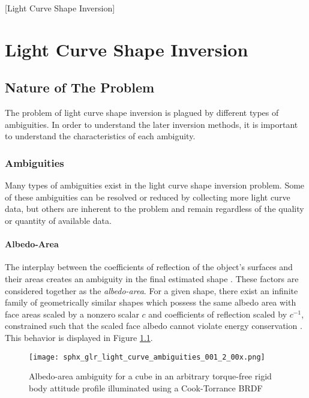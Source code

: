 [Light Curve Shape Inversion]
\graphicspath{{/Users/liamrobinson/Documents/PyLightCurves/docs/build/html/_images}}
\chapter{Light Curve Shape Inversion}

\section{Nature of The Problem}

The problem of light curve shape inversion is plagued by different types of ambiguities. In order to understand the later inversion methods, it is important to understand the characteristics of each ambiguity.

\subsection{Ambiguities}

Many types of ambiguities exist in the light curve shape inversion problem. Some of these ambiguities can be resolved or reduced by collecting more light curve data, but others are inherent to the problem and remain regardless of the quality or quantity of available data.

\subsubsection{Albedo-Area}

The interplay between the coefficients of reflection of the object's surfaces and their areas creates an ambiguity in the final estimated shape \cite{fan2020thesis}. These factors are considered together as the \textit{albedo-area}. For a given shape, there exist an infinite family of geometrically similar shapes which possess the same albedo area with face areas scaled by a nonzero scalar $c$ and coefficients of reflection scaled by $c^{-1}$, constrained such that the scaled face albedo cannot violate energy conservation \cite{fan2020thesis}. This behavior is displayed in Figure \ref{fig:albedo_amb}.

\begin{figure}[!htb]
  \centering
  \texttt{[image: sphx\_glr\_light\_curve\_ambiguities\_001\_2\_00x.png]}
  \caption{Albedo-area ambiguity for a cube in an arbitrary torque-free rigid body attitude profile illuminated using a Cook-Torrance BRDF}
  \label{fig:albedo_amb}
\end{figure}

